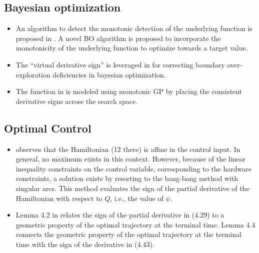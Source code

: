\documentclass[11pt]{book}
\begin{document}
\subsection{Bayesian optimization}
\begin{itemize}
\item An algorithm to detect the monotonic detection of the underlying function
is proposed in \cite{li2017bayesian}.
A novel BO algorithm is proposed to incorporate the monotonicity of
the underlying function to optimize towards a target value.
\item The \textquotedblleft virtual derivative sign\textquotedblright{}
is leveraged in \cite{siivola2018correcting}
for correcting boundary over-exploration deficiencies in bayesian
optimization.
\item The function in \cite{li2019accelerating}
is modeled using monotonic GP by placing the consistent derivative
signs across the search space.
\end{itemize}

\subsection{Optimal Control}
\begin{itemize}
\item \cite{schorsch2018identification}
observes that the Hamiltonian (12 there) is affine in the control
input. In general, no maximum exists in this context. However, because
of the linear inequality constraints on the control variable, corresponding
to the hardware constraints, a solution exists by resorting to the
bang-bang method with singular arcs. This method evaluates the sign
of the partial derivative of the Hamiltonian with respect to $Q$,
i.e., the value of $\psi$.
\item Lemma 4.2 in \cite{cheng2018reaching}
relates the sign of the partial derivative in (4.29) to a geometric
property of the optimal trajectory at the terminal time. Lemma 4.4
connects the geometric property of the optimal trajectory at the terminal
time with the sign of the derivative in (4.43).
\end{itemize}

\end{document}
